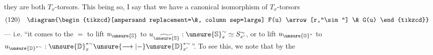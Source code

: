 they are both $T_x$-torsors.
This being so, I say that we have a canonical isomorphism of $T_x$-torsors
\[
(120)\quad
\diagram{\begin{tikzcd}[ampersand replacement=\&, column sep=large]
F(u) \arrow[r,"\sim"] \& G(u)
\end{tikzcd}}
\]
--- i.e. ``it comes to the $=$ to lift $u_{\unsure{\mathbb{S}}}$ to
$u_{\widetilde{\unsure{\mathbb{S}}}}:
\unsure{\mathbb{S}}_x^{\sim}\simeq S_{x'}^{\sim}$,
or to lift $u_{\unsure{\mathbb{D}}^*}$ to
$u_{\unsure{\mathbb{D}}^{*\sim}}:
\unsure{\mathbb{D}}_x^{*\sim}\unsure{\longrightarrow|-}
\unsure{\mathbb{D}}_{x'}^{*\sim}$''.
To see this, we note that by
 the




